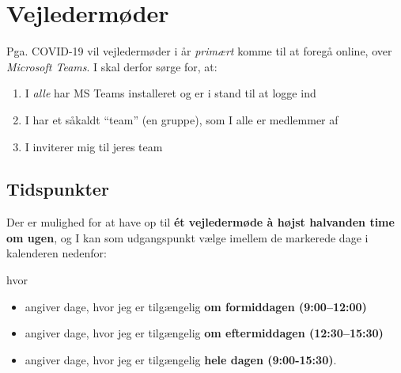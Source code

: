 \section{Vejledermøder}
\label{sec:meetings}
Pga. COVID-19 vil vejledermøder i år \emph{primært} komme til at foregå online, over \emph{Microsoft Teams}.
I skal derfor sørge for, at:
\begin{enumerate}
\item I \emph{alle} har MS Teams installeret og er i stand til at logge ind
\item I har et såkaldt ``team'' (en gruppe), som I alle er medlemmer af
\item I inviterer mig til jeres team
\end{enumerate}

\subsection{Tidspunkter}
\label{subsec:times}
Der er mulighed for at have op til \textbf{\'et vejledermøde \`a højst halvanden time om ugen}, og I kan som udgangspunkt vælge imellem de markerede dage i kalenderen nedenfor:
\begin{center}
  
\end{center}
hvor
\begin{itemize}[label={},wide,labelindent=0pt,topsep=1ex]
\item {} angiver dage, hvor jeg er tilgængelig \textbf{om formiddagen (9:00--12:00)}
\item {} angiver dage, hvor jeg er tilgængelig \textbf{om eftermiddagen (12:30--15:30)}
\item {} angiver dage, hvor jeg er tilgængelig \textbf{hele dagen (9:00-15:30)}.
\end{itemize}

